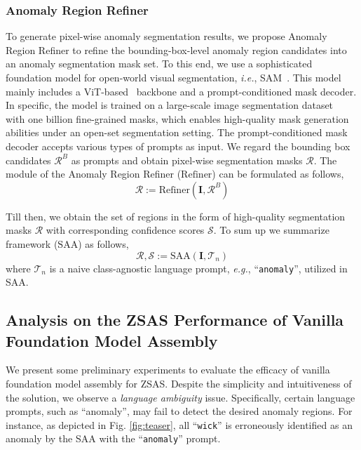 \subsubsection{Anomaly Region Refiner}

To generate pixel-wise anomaly segmentation results, we propose Anomaly Region Refiner to refine the bounding-box-level anomaly region candidates into an anomaly segmentation mask set. To this end, we use a sophisticated foundation model for open-world visual segmentation, \textit{i.e.}, SAM~\cite{kirillov2023segment}. This model mainly includes a ViT-based~\cite{dosovitskiy2021an} backbone and a prompt-conditioned mask decoder. In specific, the model is trained on a large-scale image segmentation dataset~\cite{kirillov2023segment} with one billion fine-grained masks, which enables high-quality mask generation abilities under an open-set segmentation setting. The prompt-conditioned mask decoder accepts various types of prompts as input. We regard the bounding box candidates $\mathcal{R}^B$ as prompts and obtain pixel-wise segmentation masks $\mathcal{R}$. The module of the Anomaly Region Refiner ($\mathrm{Refiner}$) can be formulated as follows,
\begin{equation}
    \mathcal{R} := \mathrm{Refiner}(\mathbf{I}, \mathcal{R}^B)
\end{equation}

Till then, we obtain the set of regions in the form of high-quality segmentation masks $\mathcal{R}$ with corresponding confidence scores $\mathcal{S}$. To sum up we summarize framework ($\mathrm{SAA}$) as follows,
\begin{equation}
    \mathcal{R}, \mathcal{S} := \mathrm{SAA}(\mathbf{I}, \mathcal{T}_n)
\end{equation}
where $\mathcal{T}_n$ is a naive class-agnostic language prompt, \textit{e.g.}, ``\verb|anomaly|'', utilized in SAA. 

\subsection{Analysis on the ZSAS Performance of Vanilla Foundation Model Assembly}

We present some preliminary experiments to evaluate the efficacy of vanilla foundation model assembly for ZSAS. Despite the simplicity and intuitiveness of the solution, we observe a \textit{language ambiguity} issue. Specifically, certain language prompts, such as ``anomaly'', may fail to detect the desired anomaly regions. For instance, as depicted in Fig. \ref{fig:teaser}, all ``\verb|wick|'' is erroneously identified as an anomaly by the SAA with the ``\verb|anomaly|'' prompt. 

